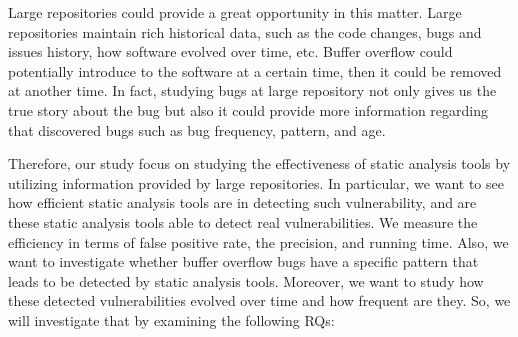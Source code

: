 Large repositories could provide a great opportunity in this matter. Large repositories maintain rich historical data, such as the code changes, bugs and issues history,  how software evolved over time, etc. Buffer overflow could potentially introduce to the software at a certain time, then it could be removed  at another time. In fact, studying bugs at large repository not only gives us the true story about the bug but also it could provide more information regarding that discovered bugs such as bug frequency, pattern, and age.  

Therefore, our study focus on studying the effectiveness of static analysis tools by utilizing information provided by large repositories. In particular, we want to see how efficient static analysis tools are in detecting such vulnerability, and are these static analysis tools able to detect real vulnerabilities.  We measure the efficiency in terms of false positive rate, the precision, and running time.  Also, we want to investigate whether buffer overflow bugs have a specific pattern that leads to be detected by static analysis tools. Moreover, we want to study how these detected vulnerabilities evolved over time and how frequent are they. So, we will investigate that by examining the following RQs: 